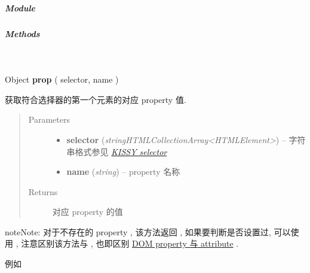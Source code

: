 \documentclass[letterpaper,10pt,english]{sphinxmanual}
\begin{document}
\subparagraph{Module}
\label{api/core/dom/prop:module}\begin{quote}

{\hyperref[api/core/dom/index:module-DOM]{}}
\end{quote}


\subparagraph{Methods}
\label{api/core/dom/prop:methods}

\begin{fulllineitems}
\label{api/core/dom/prop:DOM.prop}~
\begin{DUlineblock}{0em}
\item[] Object \textbf{prop} ( selector, name )
\item[] 获取符合选择器的第一个元素的对应 property 值.
\end{DUlineblock}
\begin{quote}\begin{description}
\item[{Parameters}] \leavevmode\begin{itemize}
\item {}
\textbf{selector} (\emph{string\textbar{}HTMLCollection\textbar{}Array\textless{}HTMLElement\textgreater{}}) -- 字符串格式参见 {\hyperref[api/core/dom/selector:dom-selector]{\emph{KISSY selector}}}

\item {}
\textbf{name} (\emph{string}) -- property 名称

\end{itemize}

\item[{Returns}] \leavevmode
对应 property 的值

\end{description}\end{quote}

\begin{notice}{note}{Note:}
对于不存在的 property , 该方法返回  , 如果要判断是否设置过, 可以使用 {\hyperref[api/core/dom/hasProp:DOM.hasProp]{}},
注意区别该方法与 {\hyperref[api/core/dom/attr:DOM.attr]{}}, 也即区别 \href{http://javascript.info/tutorial/attributes-and-custom-properties}{DOM property 与 attribute} .
\end{notice}

例如


\end{fulllineitems}
\end{document}
